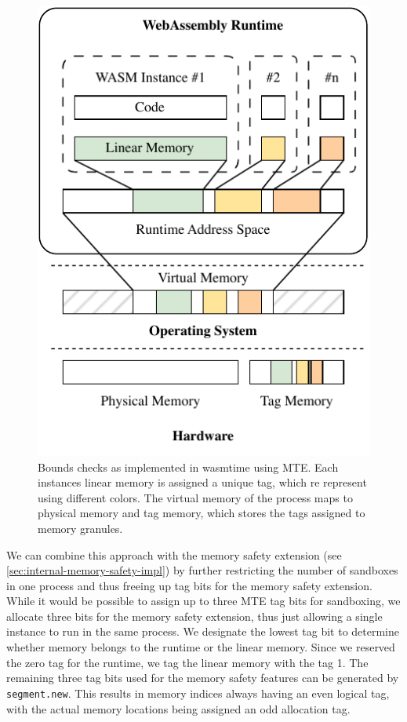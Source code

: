 \begin{figure}[t]
    \centering
    \includegraphics[scale=1]{figures/build/system-design-1}
    \caption{Bounds checks as implemented in wasmtime using \ac{MTE}. Each instances linear memory is assigned a unique tag, which re represent using different colors. The virtual memory of the process maps to physical memory and tag memory, which stores the tags assigned to memory granules.}
    \label{fig:system-design-sandboxing}
\end{figure}

We can combine this approach with the memory safety extension (see \cref{sec:internal-memory-safety-impl}) by further restricting the number of sandboxes in one process and thus freeing up tag bits for the memory safety extension.
While it would be possible to assign up to three \ac{MTE} tag bits for sandboxing, we allocate three bits for the memory safety extension, thus just allowing a single instance to run in the same process.
We designate the lowest tag bit to determine whether memory belongs to the runtime or the linear memory.
Since we reserved the zero tag for the runtime, we tag the linear memory with the tag 1.
The remaining three tag bits used for the memory safety features can be generated by \texttt{segment.new}.
This results in memory indices always having an even logical tag, with the actual memory locations being assigned an odd allocation tag.

